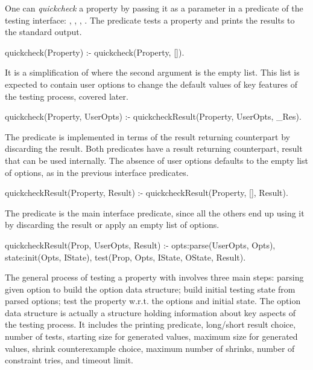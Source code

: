 One can \emph{quickcheck} a property by passing it as a parameter in a
predicate of the \plqc{} testing interface: ,
, , .
%
The predicate  tests a property and prints the results
to the standard output.
%
\begin{yapcode}
 quickcheck(Property) :-
   quickcheck(Property, []).
\end{yapcode}
%
It is a simplification of  where the second argument
is the empty list.
%
This list is expected to contain user options to change the default
values of key features of the testing process, covered later.
\begin{yapcode}
 quickcheck(Property, UserOpts)  :-
   quickcheckResult(Property, UserOpts, _Res).
\end{yapcode}
%
The predicate is implemented in terms of the result returning
counterpart by discarding the result.
%
Both  predicates have a result returning counterpart,
result that can be used internally.
%
The absence of user options defaults to the empty list of options, as in
the previous interface predicates.
\begin{yapcode}
 quickcheckResult(Property, Result) :-
   quickcheckResult(Property, [], Result).
\end{yapcode}
The predicate  is the main interface predicate,
since all the others end up using it by discarding the result or apply
an empty list of options.
\begin{yapcode}
 quickcheckResult(Prop, UserOpts, Result) :-
   opts:parse(UserOpts, Opts),
   state:init(Opts, IState),
   test(Prop, Opts, IState, OState, Result).
\end{yapcode}


The general process of testing a property with 
involves three main steps: parsing given option to build the option data
structure; build initial testing state from parsed options; test the
property w.r.t. the  options and initial state.
%
The option data structure is actually a structure holding information
about key aspects of the testing process.
%
It includes the printing predicate, long/short result choice, number of
tests, starting size for generated values, maximum size for generated
values, shrink counterexample choice, maximum number of shrinks, number
of constraint tries, and timeout limit.


